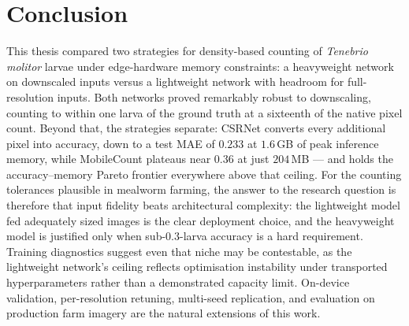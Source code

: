 \documentclass[conference]{IEEEtran}
\begin{document}
\section{Conclusion}
This thesis compared two strategies for density-based counting of
\textit{Tenebrio molitor} larvae under edge-hardware memory constraints: a
heavyweight network on downscaled inputs versus a lightweight network with
headroom for full-resolution inputs. Both networks proved remarkably robust to
downscaling, counting to within one larva of the ground truth at a sixteenth
of the native pixel count. Beyond that, the strategies separate: CSRNet
converts every additional pixel into accuracy, down to a test MAE of $0.233$
at $1.6$\,GB of peak inference memory, while MobileCount plateaus near $0.36$
at just $204$\,MB — and holds the accuracy--memory Pareto frontier everywhere
above that ceiling. For the counting tolerances plausible in mealworm farming,
the answer to the research question is therefore that input fidelity beats
architectural complexity: the lightweight model fed adequately sized images is
the clear deployment choice, and the heavyweight model is justified only when
sub-$0.3$-larva accuracy is a hard requirement. Training diagnostics suggest
even that niche may be contestable, as the lightweight network's ceiling
reflects optimisation instability under transported hyperparameters rather
than a demonstrated capacity limit. On-device validation, per-resolution
retuning, multi-seed replication, and evaluation on production farm imagery
are the natural extensions of this work.



\end{document}
